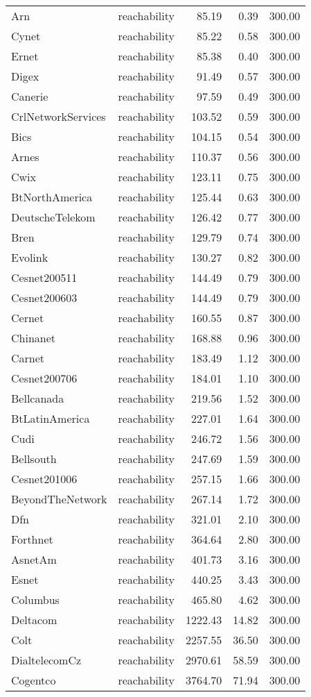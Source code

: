 \begin{tabular}{llrrr}
Arn & reachability & 85.19 & 0.39 & 300.00 \\
Cynet & reachability & 85.22 & 0.58 & 300.00 \\
Ernet & reachability & 85.38 & 0.40 & 300.00 \\
Digex & reachability & 91.49 & 0.57 & 300.00 \\
Canerie & reachability & 97.59 & 0.49 & 300.00 \\
CrlNetworkServices & reachability & 103.52 & 0.59 & 300.00 \\
Bics & reachability & 104.15 & 0.54 & 300.00 \\
Arnes & reachability & 110.37 & 0.56 & 300.00 \\
Cwix & reachability & 123.11 & 0.75 & 300.00 \\
BtNorthAmerica & reachability & 125.44 & 0.63 & 300.00 \\
DeutscheTelekom & reachability & 126.42 & 0.77 & 300.00 \\
Bren & reachability & 129.79 & 0.74 & 300.00 \\
Evolink & reachability & 130.27 & 0.82 & 300.00 \\
Cesnet200511 & reachability & 144.49 & 0.79 & 300.00 \\
Cesnet200603 & reachability & 144.49 & 0.79 & 300.00 \\
Cernet & reachability & 160.55 & 0.87 & 300.00 \\
Chinanet & reachability & 168.88 & 0.96 & 300.00 \\
Carnet & reachability & 183.49 & 1.12 & 300.00 \\
Cesnet200706 & reachability & 184.01 & 1.10 & 300.00 \\
Bellcanada & reachability & 219.56 & 1.52 & 300.00 \\
BtLatinAmerica & reachability & 227.01 & 1.64 & 300.00 \\
Cudi & reachability & 246.72 & 1.56 & 300.00 \\
Bellsouth & reachability & 247.69 & 1.59 & 300.00 \\
Cesnet201006 & reachability & 257.15 & 1.66 & 300.00 \\
BeyondTheNetwork & reachability & 267.14 & 1.72 & 300.00 \\
Dfn & reachability & 321.01 & 2.10 & 300.00 \\
Forthnet & reachability & 364.64 & 2.80 & 300.00 \\
AsnetAm & reachability & 401.73 & 3.16 & 300.00 \\
Esnet & reachability & 440.25 & 3.43 & 300.00 \\
Columbus & reachability & 465.80 & 4.62 & 300.00 \\
Deltacom & reachability & 1222.43 & 14.82 & 300.00 \\
Colt & reachability & 2257.55 & 36.50 & 300.00 \\
DialtelecomCz & reachability & 2970.61 & 58.59 & 300.00 \\
Cogentco & reachability & 3764.70 & 71.94 & 300.00 \\
\bottomrule
\end{tabular}
